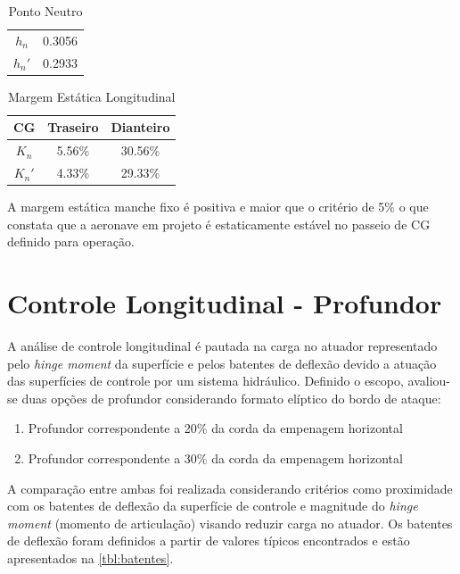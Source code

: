 \begin{table}[H]
\centering
\begin{tabular}{cc}
\toprule
$ h_n $ & 0.3056 \\
$ h_n' $ & 0.2933 \\
\bottomrule
\end{tabular}
\caption[Ponto Neutro]{Ponto Neutro}
\label{tbl:ponto_neutro}
\end{table}

\begin{table}[H]
\centering
\begin{tabular}{ccc}
\toprule
CG & Traseiro & Dianteiro \\ \midrule
$ K_n $ & 5.56\% & 30.56\% \\
$ K_n' $ & 4.33\% & 29.33\% \\
\bottomrule
\end{tabular}
\caption[Margem Estática Longitudinal]{Margem Estática Longitudinal}
\label{tbl:margem_estatica}
\end{table}

A margem estática manche fixo é positiva e maior que o critério de 5\% o que constata que a aeronave em projeto é estaticamente estável no passeio de CG definido para operação.

\section{Controle Longitudinal - Profundor}
\label{controlelongitudinal}

A análise de controle longitudinal é pautada na carga no atuador representado pelo \textit{hinge moment} da superfície e pelos batentes de deflexão devido a atuação das superfícies de controle por um sistema hidráulico. Definido o escopo, avaliou-se duas opções de profundor considerando formato elíptico do bordo de ataque:

\begin{enumerate}
\item Profundor correspondente a 20\% da corda da empenagem horizontal

\item Profundor correspondente a 30\% da corda da empenagem horizontal
\end{enumerate}

A comparação entre ambas foi realizada considerando critérios como proximidade com os batentes de deflexão da superfície de controle e magnitude do \textit{hinge moment} (momento de articulação) visando reduzir carga no atuador. Os batentes de deflexão foram definidos a partir de valores típicos encontrados e estão apresentados na \autoref{tbl:batentes}.


